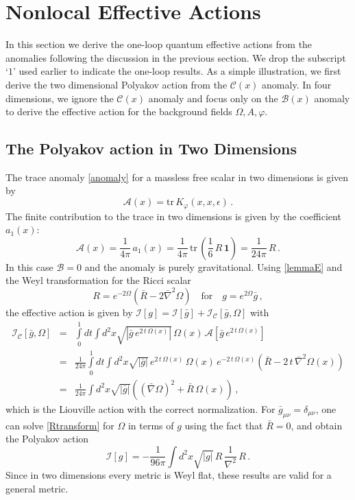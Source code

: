 \documentclass[12pt,a4paper]{article}
\newcommand{\non}{\nonumber}
\newcommand{\bea}{\begin{eqnarray}}
\newcommand{\eea}{\end{eqnarray}}
\newcommand{\be}{\begin{equation}}
\newcommand{\ee}{\end{equation}}
\newcommand{\cA}{\mathcal{A}}
\newcommand{\cB}{\mathcal{B}}
\newcommand{\cC}{\mathcal{C}}
\newcommand{\cI}{\mathcal{I}}
\newcommand{\e}{\epsilon}
\newcommand{\m}{\mu}
\newcommand{\n}{\nu}
\renewcommand{\O}{\Omega}
\newcommand{\1}{{\textbf{1}}}
\newcommand{\+}{{\,+ \,}}
\begin{document}
\section{Nonlocal Effective Actions \label{NEA}}

In this section we derive the one-loop quantum effective actions from the anomalies following the discussion in the previous section. We drop the subscript `$1$' used earlier to indicate the one-loop results.   As a simple illustration,  we first derive  the two dimensional Polyakov action from the $\cC(x)$ anomaly.  In  four dimensions,  we  ignore the  $\cC(x)$ anomaly and focus only on the $\cB(x)$ anomaly to derive the  effective action  for the background fields $\O, A, \varphi$. 


\subsection{The Polyakov action in Two Dimensions}


The trace anomaly \eqref{anomaly} for a massless  free scalar in two dimensions is given by
\be
\cA(x)=  \text{tr} \,K_{\varphi}(x,x,\e)\,.
\ee
The finite contribution to the trace in two dimensions is given by the coefficient $a_1(x)$: 
\be
\cA(x)=  \frac{1}{4\pi}\,a_1(x)= \frac{1}{4\pi}\,\text{tr}\,\left( \frac{1}{6}\,R\,\textbf{1}\right)=\frac{1}{24\pi}\,R\, .
\ee
In this case $\cB =0$ and the anomaly is purely gravitational. Using \eqref{lemmaE} and the Weyl transformation for the Ricci scalar
\be\label{Rtransform}
R = e^{-2\O}(\bar R - 2 \bar\nabla^{2}\O) \quad \textrm{for}  \quad g = e^{2\O} \bar g \, ,
\ee
 the effective action is given by $\cI[g] =\cI[\bar g] + \cI_{\cC}[\bar g, \Omega]$ with
\bea
\cI_{\cC}[\bar g, \Omega] &=& \int\limits_0^1dt\int d^2x \sqrt{|\bar g\,e^{2\,t\,\O(x)}|}\,\O(x)\, \cA[\bar g\,e^{2\,t\,\O(x)}]\non\\
&=& \frac{1}{24\pi} \int\limits_0^1dt\int d^2x \sqrt{|\bar g|}\,e^{2\,t\,\O(x)}\,\O(x)\, e^{-2\,t\,\O(x)}\left(\bar R-2\,t\,\bar\nabla^2\O(x)\right)\non\\
&=&\frac{1}{24\pi}\int d^2x \sqrt{|\bar g|}\left((\bar\nabla\O)^2+\bar R\, \O(x)\right) \, ,
\eea
which is  the Liouville action with the correct normalization. For $\bar g_{{\m\n}} = \delta_{\m\n}$, one can solve  \eqref{Rtransform} for $\Omega$ in terms of $g$ using the fact that $\bar R=0$, and
obtain  the Polyakov action
\be
\cI[g]= -\frac{1}{96\pi}\int d^2x\sqrt{|g|}\,R\,\frac{1}{\nabla^{2}}\,R\,   .
\ee
Since in two dimensions  every metric is Weyl flat, these results are valid for a general metric. 
\end{document}

